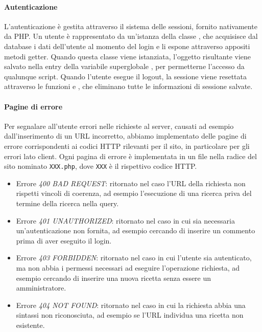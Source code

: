 \paragraph{Autenticazione}

L'autenticazione è gestita attraverso il sistema delle sessioni, fornito nativamente da PHP\@.
Un utente è rappresentato da un'istanza della classe , che acquisisce dal database i dati dell'utente al momento del login e li espone attraverso appositi metodi getter.
Quando questa classe viene istanziata, l'oggetto risultante viene salvato nella entry  della variabile superglobale , per permetterne l'accesso da qualunque script.
Quando l'utente esegue il logout, la sessione viene resettata attraverso le funzioni  e , che eliminano tutte le informazioni di sessione salvate.

\paragraph{Pagine di errore}

Per segnalare all'utente errori nelle richieste al server, causati ad esempio dall'inserimento di un URL incorretto, abbiamo implementato delle pagine di errore corrispondenti ai codici HTTP rilevanti per il sito, in particolare per gli errori lato client.
Ogni pagina di errore è implementata in un file nella radice del sito nominato \texttt{XXX.php}, dove \texttt{XXX} è il rispettivo codice HTTP\@.

\begin{itemize}
	\item Errore \textit{400 BAD REQUEST}: ritornato nel caso l'URL della richiesta non rispetti vincoli di coerenza, ad esempio l'esecuzione di una ricerca priva del termine della ricerca nella query.
	\item Errore \textit{401 UNAUTHORIZED}: ritornato nel caso in cui sia necessaria un'autenticazione non fornita, ad esempio cercando di inserire un commento prima di aver eseguito il login.
	\item Errore \textit{403 FORBIDDEN}: ritornato nel caso in cui l'utente sia autenticato, ma non abbia i permessi necessari ad eseguire l'operazione richiesta, ad esempio cercando di inserire una nuova ricetta senza essere un amministratore.
	\item Errore \textit{404 NOT FOUND}: ritornato nel caso in cui la richiesta abbia una sintassi non riconosciuta, ad esempio se l'URL individua una ricetta non esistente.
\end{itemize}

